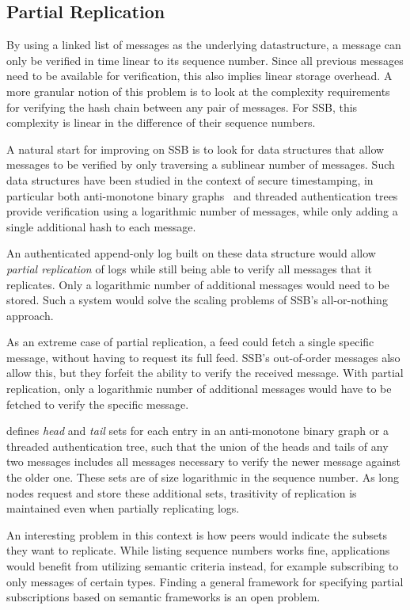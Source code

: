 \documentclass[sigconf]{acmart}
\begin{document}
\subsection{Partial Replication}

By using a linked list of messages as the underlying datastructure, a message can only be verified in time linear to its sequence number. Since all previous messages need to be available for verification, this also implies linear storage overhead. A more granular notion of this problem is to look at the complexity requirements for verifying the hash chain between any pair of messages. For SSB, this complexity is linear in the difference of their sequence numbers.

A natural start for improving on SSB is to look for data structures that allow messages to be verified by only traversing a sublinear number of messages. Such data structures have been studied in the context of secure timestamping, in particular both anti-monotone binary graphs~\cite{buldas1998new} and threaded authentication trees~\cite{buldas2000optimally} provide verification using a logarithmic number of messages, while only adding a single additional hash to each message.

An authenticated append-only log built on these data structure would allow {\em partial replication} of logs while still being able to verify all messages that it replicates. Only a logarithmic number of additional messages would need to be stored. Such a system would solve the scaling problems of SSB's all-or-nothing approach.

As an extreme case of partial replication, a feed could fetch a single specific message, without having to request its full feed. SSB's out-of-order messages also allow this, but they forfeit the ability to verify the received message. With partial replication, only a logarithmic number of additional messages would have to be fetched to verify the specific message.

\cite{lipmaa1999secure} defines {\em head} and {\em tail} sets for each entry in an anti-monotone binary graph or a threaded authentication tree, such that the union of the heads and tails of any two messages includes all messages necessary to verify the newer message against the older one. These sets are of size logarithmic in the sequence number. As long nodes request and store these additional sets, trasitivity of replication is maintained even when partially replicating logs.

An interesting problem in this context is how peers would indicate the subsets they want to replicate. While listing sequence numbers works fine, applications would benefit from utilizing semantic criteria instead, for example subscribing to only messages of certain types. Finding a general framework for specifying partial subscriptions based on semantic frameworks is an open problem.
\end{document}
